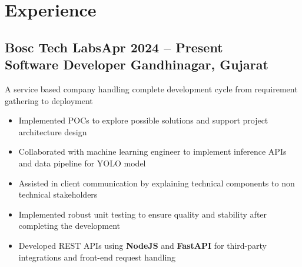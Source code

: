\documentclass[a4paper]{article}
\newcommand{\experiencetitle}[4]{\subsection{\texorpdfstring{{#1}\hfill\small \textmd{#4} \\
\textmd{#3} \hfill \textmd{#2}}{#1}}}
\begin{document}
\section{Experience}
\experiencetitle
{Bosc Tech Labs}{Gandhinagar, Gujarat}
{Software Developer}{Apr 2024 -- Present}
A service based company handling complete development cycle from requirement gathering to deployment
\begin{itemize}
	\item Implemented POCs to explore possible solutions and support project architecture design
	\item Collaborated with machine learning engineer to implement inference APIs and data pipeline for YOLO model
	\item Assisted in client communication by explaining technical components to non technical stakeholders
	\item Implemented robust unit testing to ensure quality and stability after completing the development
	\item Developed REST APIs using \textbf{NodeJS} and \textbf{FastAPI} for third-party integrations and front-end request handling
\end{itemize}
\end{document}
